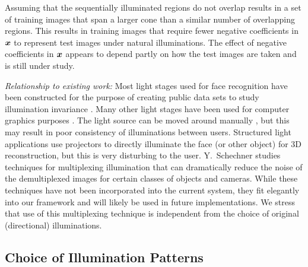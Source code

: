 \documentclass[10pt,journal,letterpaper,compsoc]{IEEEtran} %
\begin{document}
Assuming that the sequentially illuminated regions do not overlap results in a
set of training images that span a larger cone than a similar number of
overlapping regions.  This results in training images that require fewer
negative coefficients in ${\boldsymbol{x}}$ to represent test images under natural
illuminations.  The effect of negative coefficients in ${\boldsymbol{x}}$ appears to depend
partly on how the test images are taken and is still under study.

{\em Relationship to existing work:} Most light stages used for face recognition have
been constructed for the purpose of creating public data sets to study
illumination invariance \cite{Georghiades2001-PAMI, Gross2008-FGR}.  Many other
light stages have been used for computer graphics purposes
\cite{debevec2000acquiring, jones2005performance}.
The light source can be
moved around manually \cite{masselus2002free}, but this may result in poor
consistency of illuminations between users.  Structured light applications use projectors to
directly illuminate the face (or other object) \cite{zhang2002rapid} for 3D
reconstruction, but this is very disturbing to the user.
Y.\ Schechner \cite{schechner2007multiplexing}
studies techniques for multiplexing illumination that can dramatically reduce the noise
of the demultiplexed images for certain classes of objects and cameras.
While these techniques have not been incorporated into the current
system, they fit elegantly into our framework and will likely be used
in future implementations.  We stress that use of this multiplexing technique
is independent from the choice of original (directional) illuminations.

\subsection{Choice of Illumination Patterns}
\end{document}
